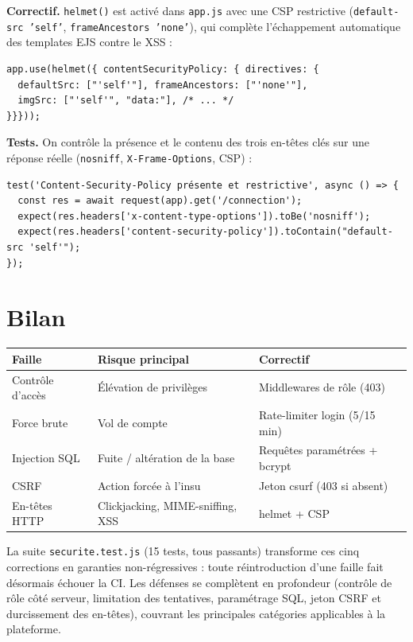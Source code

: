\documentclass[12pt,a4paper]{article}
\begin{document}
\textbf{Correctif.} \texttt{helmet()} est activé dans \texttt{app.js} avec une CSP restrictive (\texttt{default-src 'self'}, \texttt{frameAncestors 'none'}), qui complète l'échappement automatique des templates EJS contre le XSS :

\begin{lstlisting}
app.use(helmet({ contentSecurityPolicy: { directives: {
  defaultSrc: ["'self'"], frameAncestors: ["'none'"],
  imgSrc: ["'self'", "data:"], /* ... */
}}}));
\end{lstlisting}

\textbf{Tests.} On contrôle la présence et le contenu des trois en-têtes clés sur une réponse réelle (\texttt{nosniff}, \texttt{X-Frame-Options}, CSP) :

\begin{lstlisting}
test('Content-Security-Policy présente et restrictive', async () => {
  const res = await request(app).get('/connection');
  expect(res.headers['x-content-type-options']).toBe('nosniff');
  expect(res.headers['content-security-policy']).toContain("default-src 'self'");
});
\end{lstlisting}

\section{Bilan}

\begin{center}
\begin{tabular}{lll}
\toprule
\textbf{Faille} & \textbf{Risque principal} & \textbf{Correctif} \\
\midrule
\rowcolor{rowgray}
Contrôle d'accès   & Élévation de privilèges        & Middlewares de rôle (403) \\
Force brute        & Vol de compte                  & Rate-limiter login (5/15 min) \\
\rowcolor{rowgray}
Injection SQL      & Fuite / altération de la base  & Requêtes paramétrées + bcrypt \\
CSRF               & Action forcée à l'insu         & Jeton csurf (403 si absent) \\
\rowcolor{rowgray}
En-têtes HTTP      & Clickjacking, MIME-sniffing, XSS & helmet + CSP \\
\bottomrule
\end{tabular}
\end{center}
\vspace{0.5em}

La suite \texttt{securite.test.js} (15 tests, tous passants) transforme ces cinq corrections en garanties non-régressives : toute réintroduction d'une faille fait désormais échouer la CI. Les défenses se complètent en profondeur (contrôle de rôle côté serveur, limitation des tentatives, paramétrage SQL, jeton CSRF et durcissement des en-têtes), couvrant les principales catégories applicables à la plateforme.
\end{document}
